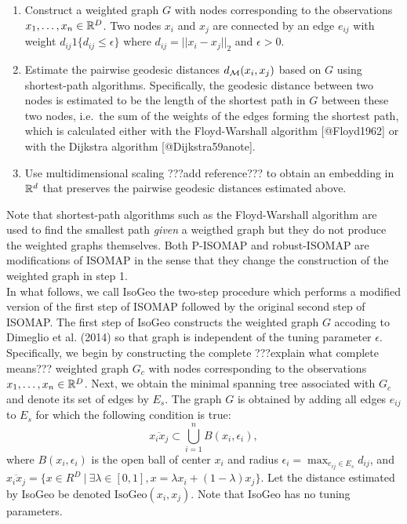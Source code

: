 \begin{enumerate}
\item Construct a weighted graph $G$ with nodes corresponding to the observations $x_1,\ldots,x_n\in \mathbb{R}^D$. Two nodes $x_i$ and $x_j$ are connected by an edge $e_{ij}$ with weight $d_{ij} 1\{d_{ij} \le \epsilon \}$ where $d_{ij}=||x_i-x_j ||_{2}$ and $\epsilon > 0$.
\item Estimate the pairwise geodesic distances $d_{\mathcal{M}}(x_i,x_j)$ based on $G$ using shortest-path algorithms. Specifically, the geodesic distance between two nodes is estimated to be the length of the shortest path in $G$ between these two nodes, i.e.\ the sum of the weights of the edges forming the shortest path, which is calculated either with the Floyd-Warshall algorithm [@Floyd1962] or with the Dijkstra algorithm [@Dijkstra59anote].
\item Use multidimensional scaling ???add reference??? to obtain an embedding in $\mathbb{R}^d$ that preserves the pairwise geodesic distances estimated above.
\end{enumerate}

Note that shortest-path algorithms such as the Floyd-Warshall algorithm
are used to find the smallest path \textit{given} a weigthed graph but
they do not produce the weighted graphs themselves. Both P-ISOMAP and
robust-ISOMAP are modifications of ISOMAP in the sense that they change
the construction of the weighted graph in step 1.\\

In what follows, we call IsoGeo the two-step procedure which performs a
modified version of the first step of ISOMAP followed by the original
second step of ISOMAP. The first step of IsoGeo constructs the weighted
graph \(G\) accoding to Dimeglio et al. (2014) so that graph is
independent of the tuning parameter \(\epsilon\). Specifically, we begin
by constructing the complete ???explain what complete means??? weighted
graph \(G_c\) with nodes corresponding to the observations
\(x_1,\ldots,x_n\in \mathbb{R}^D\). Next, we obtain the minimal spanning tree
associated with \(G_c\) and denote its set of edges by \(E_s\). The
graph \(G\) is obtained by adding all edges \(e_{ij}\) to \(E_s\) for
which the following condition is true:
\[ \overline{x_ix_j} \subset \bigcup_{i=1}^n B(x_i,\epsilon_i),\] where
\(B(x_i,\epsilon_i)\) is the open ball of center \(x_i\) and radius
\(\epsilon_i = \max_{e_{ij}\in E_s}d_{ij}\), and
\(\overline{x_ix_j}= \{x\in R^D \ | \ \exists \lambda \in [0,1], x=\lambda x_i + (1-\lambda)x_j \}\).
Let the distance estimated by IsoGeo be denoted
\(\text{IsoGeo}(x_i,x_j)\). Note that IsoGeo has no tuning parameters.

